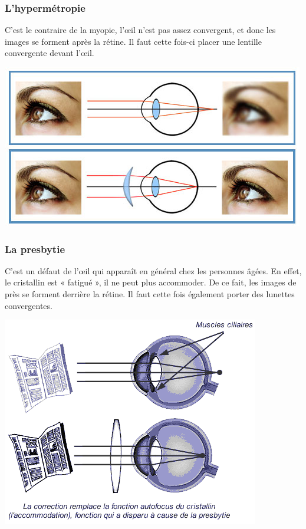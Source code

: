 \documentclass[a4paper, 12pt, onecolumn, openany]{report}
\begin{document}
	\subsubsection{L'hypermétropie}
	C’est le contraire de la myopie, l’œil n’est pas assez convergent, et donc les images se forment après la rétine. Il faut cette fois-ci placer une lentille convergente devant l’œil.
	
	\includegraphics[scale=0.5]{hypermetropie.jpg}
	
	\subsubsection{La presbytie}
	C’est un défaut de l’œil qui apparaît en général chez les personnes âgées. En effet, le cristallin est « fatigué », il ne peut plus accommoder. De ce fait, les images de près se forment derrière la rétine. Il faut cette fois également porter des lunettes convergentes.
	
	\includegraphics[scale=0.7]{presbytie.png}
	
\end{document}
